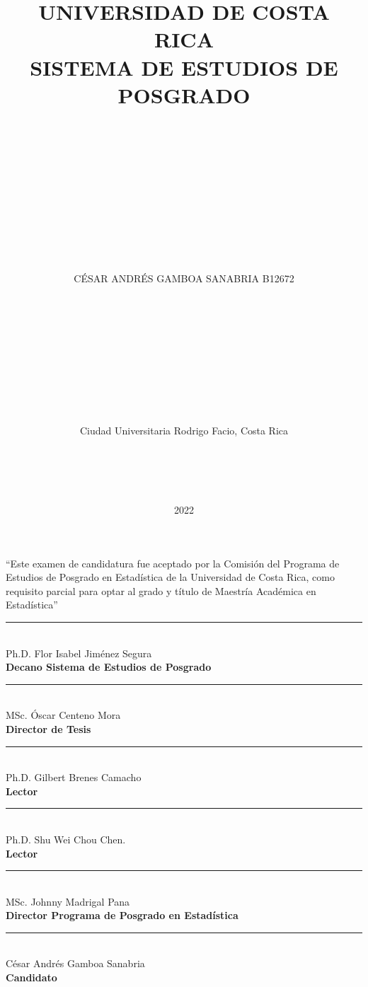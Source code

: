 \documentclass[
]{article}
\title{UNIVERSIDAD DE COSTA RICA\\
SISTEMA DE ESTUDIOS DE POSGRADO\\
\strut \\
\strut \\
\strut \\}
\subtitle{LA SOBREPARAMETRIZACIÓN EN EL ARIMA: UNA APLICACIÓN A DATOS
COSTARRICENCES\\
\strut \\
\strut \\
\strut \\
\strut \\
Examen de candidatura sometido a la consideración de la Comisión del
Programa de Estudios de Posgrado en Estadística para optar por el grado
y título de Maestría Académica en Estadística}
\author{\hfill\break
\hfill\break
\hfill\break
\hfill\break
\hfill\break
CÉSAR ANDRÉS GAMBOA SANABRIA B12672\\
\strut \\
\strut \\
\strut \\
\strut \\
\strut \\
Ciudad Universitaria Rodrigo Facio, Costa Rica\\
\strut \\
\strut \\}
\date{2022}
\begin{document}
\maketitle

\cleardoublepage

\newpage

\cleardoublepage

\begin{center}

``Este examen de candidatura fue aceptado por la Comisión del Programa de Estudios de Posgrado en Estadística de la Universidad de Costa Rica, como requisito parcial para optar al grado y título de Maestría Académica en Estadística''

\text{}

\noindent\rule{7cm}{0.4pt}\\
Ph.D. Flor Isabel Jiménez Segura\\
\textbf{Decano Sistema de Estudios de Posgrado}

\text{}

\noindent\rule{7cm}{0.4pt}\\
MSc. Óscar Centeno Mora\\
\textbf{Director de Tesis}

\text{}

\noindent\rule{7cm}{0.4pt}\\
Ph.D. Gilbert Brenes Camacho\\
\textbf{Lector}

\text{}

\noindent\rule{7cm}{0.4pt}\\
Ph.D. Shu Wei Chou Chen.\\
\textbf{Lector}

\text{}

\noindent\rule{7cm}{0.4pt}\\
MSc. Johnny Madrigal Pana\\
\textbf{Director Programa de Posgrado en Estadística}

\text{}

\noindent\rule{7cm}{0.4pt}\\
César Andrés Gamboa Sanabria\\
\textbf{Candidato}

\end{center}

\cleardoublepage

\tableofcontents
\listoftables
\listoffigures

\cleardoublepage
{}
\end{document}
